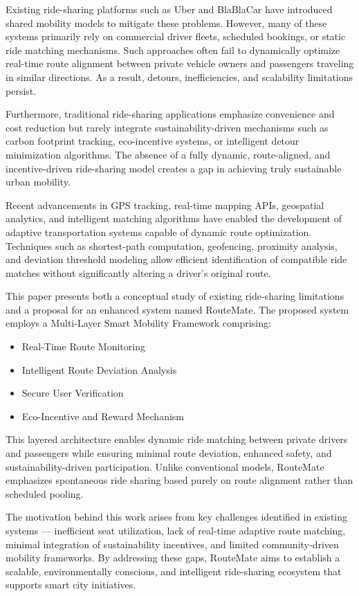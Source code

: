 \documentclass[conference]{IEEEtran}
\begin{document}
Existing ride-sharing platforms such as Uber and BlaBlaCar have introduced shared mobility models to mitigate these problems. However, many of these systems primarily rely on commercial driver fleets, scheduled bookings, or static ride matching mechanisms. Such approaches often fail to dynamically optimize real-time route alignment between private vehicle owners and passengers traveling in similar directions. As a result, detours, inefficiencies, and scalability limitations persist.

Furthermore, traditional ride-sharing applications emphasize convenience and cost reduction but rarely integrate sustainability-driven mechanisms such as carbon footprint tracking, eco-incentive systems, or intelligent detour minimization algorithms. The absence of a fully dynamic, route-aligned, and incentive-driven ride-sharing model creates a gap in achieving truly sustainable urban mobility.

Recent advancements in GPS tracking, real-time mapping APIs, geospatial analytics, and intelligent matching algorithms have enabled the development of adaptive transportation systems capable of dynamic route optimization. Techniques such as shortest-path computation, geofencing, proximity analysis, and deviation threshold modeling allow efficient identification of compatible ride matches without significantly altering a driver’s original route.

This paper presents both a conceptual study of existing ride-sharing limitations and a proposal for an enhanced system named RouteMate. The proposed system employs a Multi-Layer Smart Mobility Framework comprising:
\begin{itemize}
\item Real-Time Route Monitoring
\item Intelligent Route Deviation Analysis
\item Secure User Verification
\item Eco-Incentive and Reward Mechanism
\end{itemize}

This layered architecture enables dynamic ride matching between private drivers and passengers while ensuring minimal route deviation, enhanced safety, and sustainability-driven participation. Unlike conventional models, RouteMate emphasizes spontaneous ride sharing based purely on route alignment rather than scheduled pooling.

The motivation behind this work arises from key challenges identified in existing systems — inefficient seat utilization, lack of real-time adaptive route matching, minimal integration of sustainability incentives, and limited community-driven mobility frameworks. By addressing these gaps, RouteMate aims to establish a scalable, environmentally conscious, and intelligent ride-sharing ecosystem that supports smart city initiatives.
\end{document}
